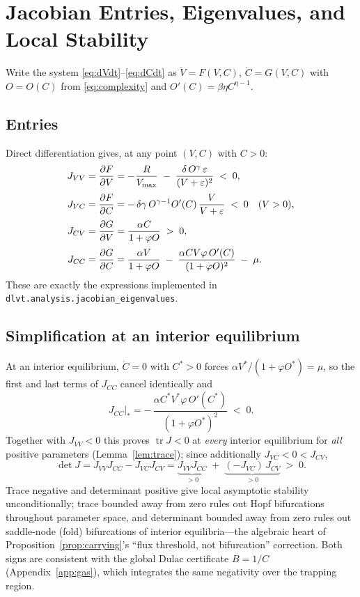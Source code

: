 \section{Jacobian Entries, Eigenvalues, and Local Stability}
\label{app:jacobian}

Write the system \eqref{eq:dVdt}--\eqref{eq:dCdt} as
$\dot V=F(V,C)$, $\dot C=G(V,C)$ with $O=O(C)$ from \eqref{eq:complexity}
and $O'(C)=\beta\eta C^{\eta-1}$.

\subsection{Entries}

Direct differentiation gives, at any point $(V,C)$ with $C>0$:
\begin{align*}
J_{VV} &= \frac{\partial F}{\partial V}
        = -\frac{R}{V_{\max}}
          \;-\;\frac{\delta\,O^{\gamma}\,\varepsilon}{(V+\varepsilon)^{2}}
        \;<\;0 ,\\[2pt]
J_{VC} &= \frac{\partial F}{\partial C}
        = -\,\delta\gamma\,O^{\gamma-1}O'(C)\,\frac{V}{V+\varepsilon}
        \;<\;0 \quad (V>0),\\[2pt]
J_{CV} &= \frac{\partial G}{\partial V}
        = \frac{\alpha C}{1+\varphi O}
        \;>\;0 ,\\[2pt]
J_{CC} &= \frac{\partial G}{\partial C}
        = \frac{\alpha V}{1+\varphi O}
          \;-\;\frac{\alpha C V\varphi\,O'(C)}{(1+\varphi O)^{2}}
          \;-\;\mu .
\end{align*}
These are exactly the expressions implemented in
\texttt{dlvt.analysis.jacobian\_eigenvalues}.

\subsection{Simplification at an interior equilibrium}

At an interior equilibrium, $\dot C=0$ with $C^{*}>0$ forces
$\alpha V^{*}/(1+\varphi O^{*})=\mu$, so the first and last terms of
$J_{CC}$ cancel identically and
\[
J_{CC}\big|_{*}
= -\,\frac{\alpha C^{*}V^{*}\varphi\,O'(C^{*})}{(1+\varphi O^{*})^{2}}
\;<\;0 .
\]
Together with $J_{VV}<0$ this proves $\operatorname{tr}J<0$ at
\emph{every} interior equilibrium for \emph{all} positive parameters
(Lemma~\ref{lem:trace}); since additionally $J_{VC}<0<J_{CV}$,
\[
\det J = J_{VV}J_{CC}-J_{VC}J_{CV}
       = \underbrace{J_{VV}J_{CC}}_{>0}
         \;+\;\underbrace{(-J_{VC})\,J_{CV}}_{>0} \;>\;0 .
\]
Trace negative and determinant positive give local asymptotic stability
unconditionally; trace bounded away from zero rules out Hopf bifurcations
throughout parameter space, and determinant bounded away from zero rules
out saddle-node (fold) bifurcations of interior equilibria---the algebraic
heart of Proposition~\ref{prop:carrying}'s ``flux threshold, not
bifurcation'' correction. Both signs are consistent with the global Dulac
certificate $B=1/C$ (Appendix~\ref{app:gas}), which integrates the same
negativity over the trapping region.

